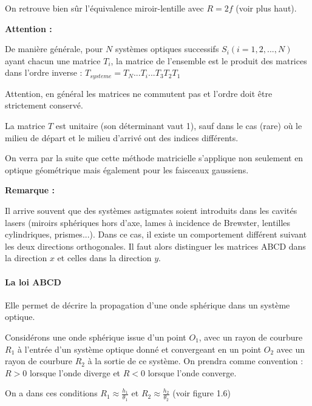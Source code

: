 \documentclass{book}
\begin{document}
On retrouve bien sûr l'équivalence miroir-lentille avec $R=2f$ (voir plus haut).

\textbf{\color{attention1}Attention :}  
\begin{mdframed}[linecolor=attention1, backgroundcolor=attention2]

De manière générale, pour $N$ systèmes optiques successifs $S_i (i=1,2,...,N)$ ayant chacun une matrice $T_i$, la matrice de l'ensemble est le produit des matrices dans l'ordre inverse : $T_{systeme}=T_N...T_i...T_3T_2T_1$

Attention, en général les matrices ne commutent pas et l'ordre doit être strictement conservé.

La matrice $T$ est unitaire (son déterminant vaut 1), sauf dans le cas (rare) où le milieu de départ et le milieu d'arrivé ont des indices différents.

On verra par la suite que cette méthode matricielle s'applique non seulement en optique géométrique mais également pour les faisceaux gaussiens.
\end{mdframed}

\textbf{\color{remarque1}Remarque :}  
\begin{mdframed}[linecolor=remarque1, backgroundcolor=remarque2]

Il arrive souvent que des systèmes astigmates soient introduits dans les cavités lasers (miroirs sphériques hors d'axe, lames à incidence de Brewster, lentilles cylindriques, prismes...). Dans ce cas, il existe un comportement différent suivant les deux directions orthogonales. Il faut alors distinguer les matrices ABCD dans la direction $x$ et celles dans la direction $y$.
\end{mdframed}
\paragraph{La loi ABCD}

Elle permet de décrire la propagation d'une onde sphérique dans un système optique.

Considérons une onde sphérique issue d'un point $O_1$, avec un rayon de courbure $R_1$ à l'entrée d'un système optique donné et convergeant en un point $O_2$ avec un rayon de courbure $R_2$ à la sortie de ce système. On prendra comme convention : $R>0$ lorsque l'onde diverge et $R<0$ lorsque l'onde converge.

On a dans ces conditions $R_1 \approx \frac {h_1}{\theta_1}$ et $R_2 \approx \frac {h_2}{\theta_2}$ (voir figure 1.6)
\end{document}
